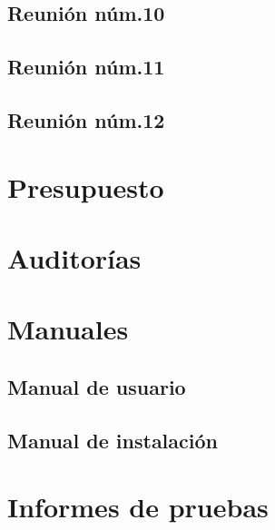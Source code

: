 \documentclass[10pt,spanish]{article}
\begin{document}
\subsection{Reunión núm.10}
%

\subsection{Reunión núm.11}


\subsection{Reunión núm.12}

\blindtext

\section{Presupuesto}

\blindtext

\section{Auditorías}

\blindtext

\section{Manuales}

\blindtext
\subsection{Manual de usuario}

\blindtext
\subsection{Manual de instalación}

\blindtext

\section{Informes de pruebas}

\blindtext
\end{document}
